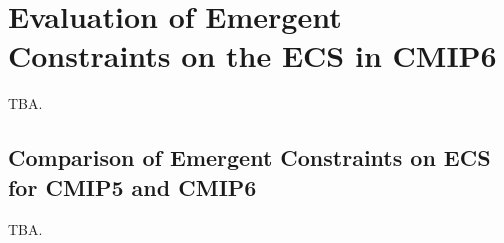 


\chapter{Evaluation of Emergent Constraints on the \acl{ECS} in \acs{CMIP}6}
\label{ch:05:paper_ecs}

TBA.


\section{Comparison of Emergent Constraints on \acs{ECS} for \acs{CMIP}5 and \acs{CMIP}6}
\label{sec:05:comparison_of_emergent_constraints}

TBA.